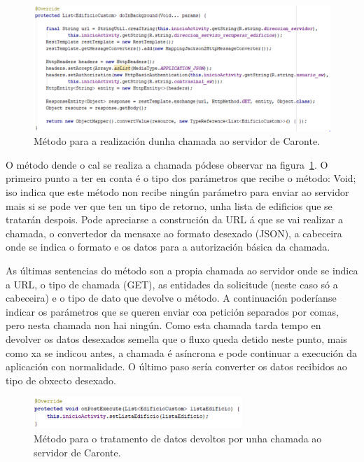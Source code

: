 \begin{figure}[htb] 
	\begin{center}
		\includegraphics[width=1\textwidth]{figures/codigo/chamadaServidorBackground}
		\caption{Método para a realización dunha chamada ao servidor de Caronte.}
		\label{fig:chamadaServidorBackground}
	\end{center}
\end{figure}

O método dende o cal se realiza a chamada pódese observar na figura~\ref{fig:chamadaServidorBackground}. O primeiro punto a ter en conta é o tipo dos parámetros que recibe o método: Void; iso indica que este método non recibe ningún parámetro para enviar ao servidor mais si se pode ver que ten un tipo de retorno, unha lista de edificios que se tratarán despois. Pode apreciarse a construción da URL á que se vai realizar a chamada, o convertedor da mensaxe ao formato desexado (JSON), a cabeceira onde se indica o formato e os datos para a autorización básica da chamada.

As últimas sentencias do método son a propia chamada ao servidor onde se indica a URL, o tipo de chamada (GET), as entidades da solicitude (neste caso só a cabeceira) e o tipo de dato que devolve o método. A continuación poderíanse indicar os parámetros que se queren enviar coa petición separados por comas, pero nesta chamada non hai ningún. Como esta chamada tarda tempo en devolver os datos desexados semella que o fluxo queda detido neste punto, mais como xa se indicou antes, a chamada é asíncrona e pode continuar a execución da aplicación con normalidade. O último paso sería converter os datos recibidos ao tipo de obxecto desexado.


\begin{figure}[htb] 
	\begin{center}
		\includegraphics[width=0.7\textwidth]{figures/codigo/chamadaServidorPost}
		\caption{Método para o tratamento de datos devoltos por unha chamada ao servidor de Caronte.}
		\label{fig:chamadaServidorPost}
	\end{center}
\end{figure}


